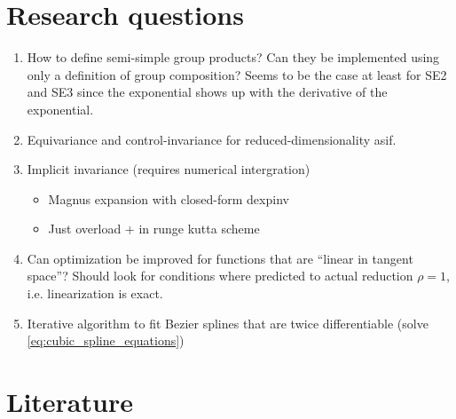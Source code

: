 
\section{Research questions}

\begin{enumerate}
  \item How to define semi-simple group products? Can they be implemented using only a definition of group composition? Seems to be the case at least for SE2 and SE3 since the exponential shows up with the derivative of the exponential.
  \item Equivariance and control-invariance for reduced-dimensionality asif.
  \item Implicit invariance (requires numerical intergration)
  \begin{itemize}
      \item Magnus expansion with closed-form dexpinv
      \item Just overload + in runge kutta scheme
  \end{itemize}
  \item Can optimization be improved for functions that are ``linear in tangent space''? Should look for conditions where predicted to actual reduction $\rho = 1$, i.e. linearization is exact.
  \item Iterative algorithm to fit Bezier splines that are twice differentiable (solve \eqref{eq:cubic_spline_equations})
\end{enumerate}


\section{Literature}

